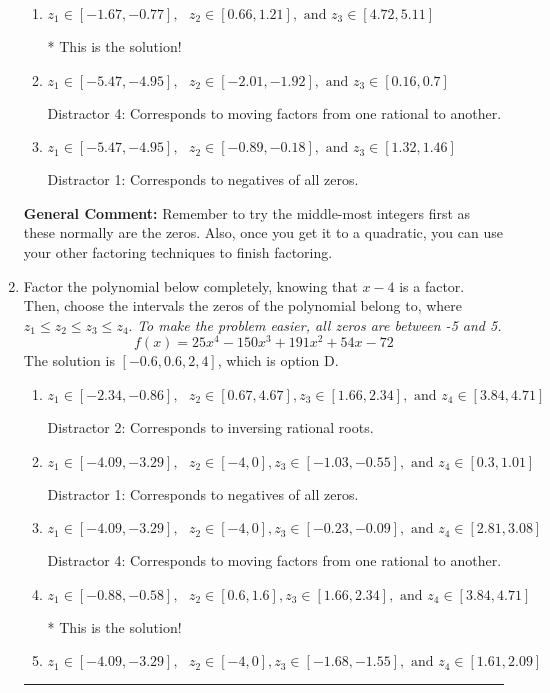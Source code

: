 \documentclass{extbook}[14pt]
\newcommand{\litem}[1]{\item #1

\rule{\textwidth}{0.4pt}}
\begin{document}
\begin{enumerate}
{\begin{enumerate}[label=\Alph*.]
 Distractor 2: Corresponds to inversing rational roots.
\item \( z_1 \in [-1.67, -0.77], \text{   }  z_2 \in [0.66, 1.21], \text{   and   } z_3 \in [4.72, 5.11] \)

* This is the solution!
\item \( z_1 \in [-5.47, -4.95], \text{   }  z_2 \in [-2.01, -1.92], \text{   and   } z_3 \in [0.16, 0.7] \)

 Distractor 4: Corresponds to moving factors from one rational to another.
\item \( z_1 \in [-5.47, -4.95], \text{   }  z_2 \in [-0.89, -0.18], \text{   and   } z_3 \in [1.32, 1.46] \)

 Distractor 1: Corresponds to negatives of all zeros.
\end{enumerate}

\textbf{General Comment:} Remember to try the middle-most integers first as these normally are the zeros. Also, once you get it to a quadratic, you can use your other factoring techniques to finish factoring.
}
\litem{
Factor the polynomial below completely, knowing that $x-4$ is a factor. Then, choose the intervals the zeros of the polynomial belong to, where $z_1 \leq z_2 \leq z_3 \leq z_4$. \textit{To make the problem easier, all zeros are between -5 and 5.}
\[ f(x) = 25x^{4} -150 x^{3} +191 x^{2} +54 x -72 \]The solution is \( [-0.6, 0.6, 2, 4] \), which is option D.\begin{enumerate}[label=\Alph*.]
\item \( z_1 \in [-2.34, -0.86], \text{   }  z_2 \in [0.67, 4.67], z_3 \in [1.66, 2.34], \text{   and   } z_4 \in [3.84, 4.71] \)

 Distractor 2: Corresponds to inversing rational roots.
\item \( z_1 \in [-4.09, -3.29], \text{   }  z_2 \in [-4, 0], z_3 \in [-1.03, -0.55], \text{   and   } z_4 \in [0.3, 1.01] \)

 Distractor 1: Corresponds to negatives of all zeros.
\item \( z_1 \in [-4.09, -3.29], \text{   }  z_2 \in [-4, 0], z_3 \in [-0.23, -0.09], \text{   and   } z_4 \in [2.81, 3.08] \)

 Distractor 4: Corresponds to moving factors from one rational to another.
\item \( z_1 \in [-0.88, -0.58], \text{   }  z_2 \in [0.6, 1.6], z_3 \in [1.66, 2.34], \text{   and   } z_4 \in [3.84, 4.71] \)

* This is the solution!
\item \( z_1 \in [-4.09, -3.29], \text{   }  z_2 \in [-4, 0], z_3 \in [-1.68, -1.55], \text{   and   } z_4 \in [1.61, 2.09] \)


\end{enumerate}}
\end{enumerate}
\end{document}
